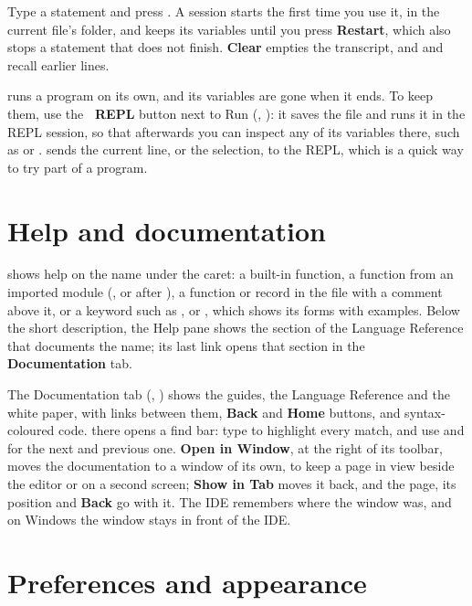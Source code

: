 \documentclass[11pt,a4paper,openany]{report}
\begin{document}
Type a statement and press . A session starts the first time you use
it, in the current file's folder, and keeps its variables until you press
\textbf{Restart}, which also stops a statement that does not finish.
\textbf{Clear} empties the transcript, and  and  recall
earlier lines.

 runs a program on its own, and its variables are gone when it ends. To
keep them, use the \textbf{\textrightarrow\ REPL} button next to Run
(, ): it saves the file and runs it in the
REPL session, so that afterwards you can inspect any of its variables there,
such as  or .  sends the current line, or
the selection, to the REPL, which is a quick way to try part of a program.

\section{Help and documentation}

 shows help on the name under the caret: a built-in function, a
function from an imported module (, or  after
), a function or record in the file with a
\code{##} comment above it, or a keyword such as ,  or
, which shows its forms with examples. Below the short description, the Help pane shows
the section of the Language Reference that documents the name; its last link
opens that section in the \textbf{Documentation} tab.

The Documentation tab (, ) shows the
guides, the Language Reference and the white paper, with links between them,
\textbf{Back} and \textbf{Home} buttons, and syntax-coloured code.
 there opens a find bar: type to highlight every match, and use
 and  for the next and previous one.
\textbf{Open in Window}, at the right of its toolbar, moves the documentation
to a window of its own, to keep a page in view beside the editor or on a
second screen; \textbf{Show in Tab} moves it back, and the page, its
position and \textbf{Back} go with it. The IDE remembers where the window
was, and on Windows the window stays in front of the IDE.

\section{Preferences and appearance}
\end{document}
